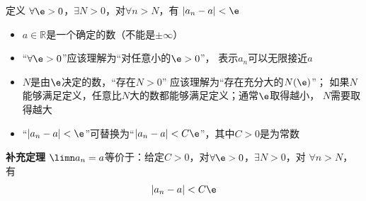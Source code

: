 
\begin{frame}
	\linespread{1.2}
	\begin{block}{定义}
		{\bb $\forall\e>0$，$\exists N>0$，对$\forall n>N$，有
		$|a_n-a|<\e$}
	\end{block}\pause 
	\begin{itemize}
	  \item $a\in\mathbb{R}$是一个确定的数\pause （\alert {不能是$\pm\infty$}）\pause 
	  \item “$\forall\e>0$”应该理解为\alert{“对任意小的$\e>0$”}，\pause
	  表示$a_n$可以无限接近$a$\pause
	  \item $N$是由$\e$决定的数，\pause “存在$N>0$”\pause
	  应该理解为\alert{“存在充分大的$N(\e)$}”；\pause 
	   如果$N$能够满足定义，\pause 任意比$N$大的数都能够满足定义；\pause 通常$\e$取得越小，
	  $N$需要取得越大\pause 
	  \item “$|a_n-a|<\e$”\pause 可替换为\alert{“$|a_n-a|<C\e$”}，\pause 其中$C>0$是为常数
	\end{itemize}
\end{frame}

\begin{frame}
	\linespread{1.5}
	\begin{block}{{\bf 补充定理}}
		$\limn a_n=a$等价于：给定$C>0$，对$\forall\e>0$，$\exists N>0$，对
		$\forall n>N$，有
		$$|a_n-a|<C\e$$
	\end{block}
\end{frame}

